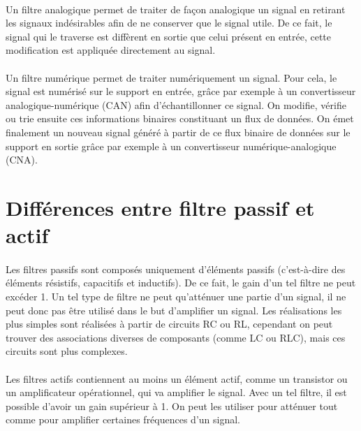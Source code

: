 \documentclass[a4paper,11pt]{article}
\begin{document}
    \paragraph{}
Un filtre analogique permet de traiter de façon analogique un signal en retirant les signaux indésirables afin de ne conserver que le signal utile.
De ce fait, le signal qui le traverse est diffèrent en sortie que celui présent en entrée, cette modification est appliquée directement au signal.
    \paragraph{}
Un filtre numérique permet de traiter numériquement un signal.
Pour cela, le signal est numérisé sur le support en entrée, grâce par exemple à un convertisseur analogique-numérique (CAN) afin d’échantillonner ce signal.
On modifie, vérifie ou trie ensuite ces informations binaires constituant un flux de données.
On émet finalement un nouveau signal généré à partir de ce flux binaire de données sur le support en sortie grâce par exemple à un convertisseur numérique-analogique (CNA).

    \clearpage


\section{Différences entre filtre passif et actif}
    \paragraph{}
Les filtres passifs sont composés uniquement d’éléments passifs (c’est-à-dire des éléments résistifs, capacitifs et inductifs).
De ce fait, le gain d’un tel filtre ne peut excéder 1. Un tel type de filtre ne peut qu’atténuer une partie d’un signal,
il ne peut donc pas être utilisé dans le but d’amplifier un signal.
Les réalisations les plus simples sont réalisées à partir de circuits RC ou RL, cependant on peut trouver des associations diverses de composants (comme LC ou RLC),
mais ces circuits sont plus complexes.
    \paragraph{}
Les filtres actifs contiennent au moins un élément actif, comme un transistor ou un amplificateur opérationnel, qui va amplifier le signal.
Avec un tel filtre, il est possible d’avoir un gain supérieur à 1.
On peut les utiliser pour atténuer tout comme pour amplifier certaines fréquences d’un signal.
\end{document}
